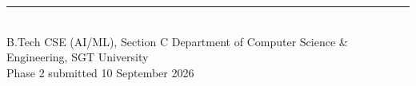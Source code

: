 \documentclass[11pt,a4paper]{article}
\begin{document}
\vspace{1.2\baselineskip}
{\color{blue200}\rule{\textwidth}{0.5pt}}\\[5pt]
{\footnotesize\sffamily\color{grey600}
B.Tech CSE (AI/ML), Section C \quad\textperiodcentered\quad
Department of Computer Science \& Engineering, SGT University\\[2pt]
Phase 2 \quad\textperiodcentered\quad submitted 10 September 2026}
\end{document}
